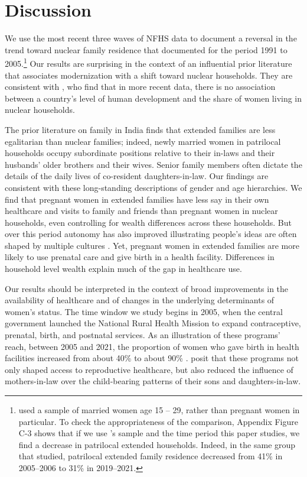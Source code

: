 \documentclass[10pt,twoside,reqno]{article}
\begin{document}
\section*{Discussion}

We use the most recent three waves of NFHS data to document a reversal in the trend toward nuclear family residence that \cite{allendorf2013going} documented for the period 1991 to 2005.\footnote{\cite{allendorf2013going} used a sample of married women age 15 -- 29, rather than pregnant women in particular.  To check the appropriateness of the comparison, Appendix Figure C-3 shows that if we use \cite{allendorf2012women}'s sample and the time period this paper studies, we find a decrease in patrilocal extended households.  Indeed, in the same group that \cite{allendorf2013going} studied, patrilocal extended family residence decreased from 41\% in 2005--2006 to 31\% in 2019--2021.}  Our results are surprising in the context of an influential prior literature that associates modernization with a shift toward nuclear households.  They are consistent with \cite{pesando2018global}, who find that in more recent data, there is no association between a country's level of human development and the share of women living in nuclear households.

The prior literature on family in India finds that extended families are less egalitarian than nuclear families; indeed, newly married women in patrilocal households occupy subordinate positions relative to their in-laws and their husbands' older brothers and their wives. Senior family members often dictate the details of the daily lives of co-resident daughters-in-law. Our findings are consistent with these long-standing descriptions of gender and age hierarchies.  We find that pregnant women in extended families have less say in their own healthcare and visits to family and friends than pregnant women in nuclear households, even controlling for wealth differences across these households. But over this period autonomy has also improved illustrating people's ideas are often shaped by multiple cultures \citep{allendorf2013schemas}.  Yet, pregnant women in extended families are more likely to use prenatal care and give birth in a health facility.  Differences in household level wealth explain much of the gap in healthcare use. 

Our results should be interpreted in the context of broad improvements in the availability of healthcare and of changes in the underlying determinants of women's status.  The time window we study begins in 2005, when the central government launched the National Rural Health Mission to expand contraceptive, prenatal, birth, and postnatal services.  As an illustration of these programs' reach, between 2005 and 2021, the proportion of women who gave birth in health facilities increased from about 40\% to about 90\% \citep{IIPS2007NFHS3,IIPS2021NFHS5}.  \cite{char2010influence} posit that these programs not only shaped access to reproductive healthcare, but also reduced the influence of mothers-in-law over the child-bearing patterns of their sons and daughters-in-law.  
\end{document}
